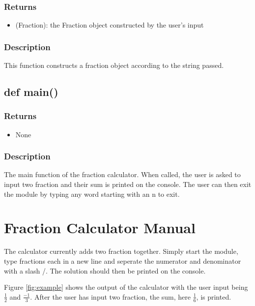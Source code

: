 \documentclass[refman]{scrartcl}
\begin{document}
\subsubsection*{Returns}

\begin{itemize}
	\item (Fraction): the Fraction object constructed by the user's input
\end{itemize}

\subsubsection*{Description}

This function constructs a fraction object according to the string passed.

\subsection{def main()}

\subsubsection*{Returns}

\begin{itemize}
	\item None
\end{itemize}

\subsubsection*{Description}

The main function of the fraction calculator. When called, the user is asked to input two fraction and their sum is printed on the console. The user can then exit the module by typing any word starting with an n to exit.

\section{Fraction Calculator Manual}

The calculator currently adds two fraction together. Simply start the module, type fractions each in a new line and seperate the numerator and denominator with a slash /. The solution should then be printed on the console.

Figure \ref{fig:example} shows the output of the calculator with the user input being \(\frac{1}{2}\) and \(\frac{-1}{3}\). After the user has input two fraction, the sum, here \(\frac{1}{6}\), is printed.
\end{document}
